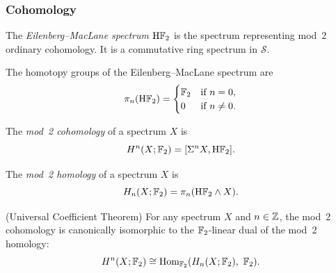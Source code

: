 \subsubsection{Cohomology}\label{sec:prereq-cohomology}

\begin{definition}\label{prereq:def:eilenberg-maclane}
    \leanok
    The \emph{Eilenberg--MacLane spectrum} $\mathrm{H}{\mathbb F}_2$ is the spectrum representing mod~2 ordinary cohomology. It is a commutative ring spectrum in $\mathcal{S}$.
\end{definition}

\begin{axiom}\label{prereq:ax:eilenberg-maclane-homotopy}
    \leanok
    The homotopy groups of the Eilenberg--MacLane spectrum are
    $$\pi_n(\mathrm{H}{\mathbb F}_2) = \begin{cases} {\mathbb F}_2 & \text{if } n = 0, \\ 0 & \text{if } n \neq 0.\end{cases}$$
\end{axiom}

\begin{definition}\label{prereq:def:mod2-cohomology}
    \leanok
    The \emph{mod~2 cohomology} of a spectrum $X$ is
    $$H^n(X; {\mathbb F}_2) = [\Sigma^n X, \mathrm{H}{\mathbb F}_2].$$
\end{definition}

\begin{definition}\label{prereq:def:mod2-homology}
    \leanok
    The \emph{mod~2 homology} of a spectrum $X$ is
    $$H_n(X; {\mathbb F}_2) = \pi_n(\mathrm{H}{\mathbb F}_2 \wedge X).$$
\end{definition}

\begin{axiom}\label{prereq:ax:universal-coefficient}
    (Universal Coefficient Theorem) For any spectrum $X$ and $n \in {\mathbb Z}$, the mod~2 cohomology is canonically isomorphic to the ${\mathbb F}_2$-linear dual of the mod~2 homology:
    $$H^n(X; {\mathbb F}_2) \cong \mathrm{Hom}_{{\mathbb F}_2}(H_n(X; {\mathbb F}_2),\ {\mathbb F}_2).$$
\end{axiom}

